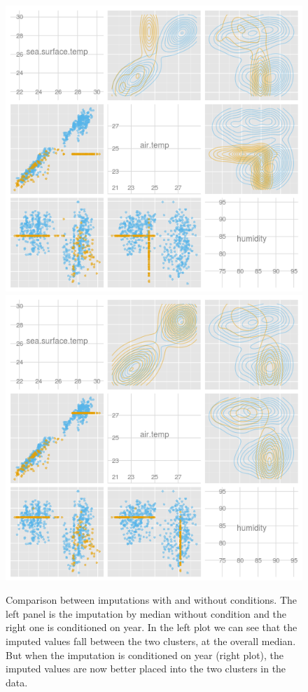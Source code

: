 \documentclass[article]{jss}
\begin{document}
\begin{center}
\begin{figure}[h]
\begin{centering}
\includegraphics[width=.48\textwidth]{graph/fig4-1-median-uncondition}
\includegraphics[width=.48\textwidth]{graph/fig4-2-median-condition}
\par\end{centering}
\caption{Comparison between imputations with and without conditions. The left panel is the imputation by median without condition and the right one is conditioned on year. In the left plot we can see that the imputed values fall between the two clusters, at the overall median. But when the imputation is conditioned on year (right plot), the imputed values are now better placed into the two clusters in the data.}
\label{fig: condition}
\end{figure}
\par\end{center}
\end{document}
